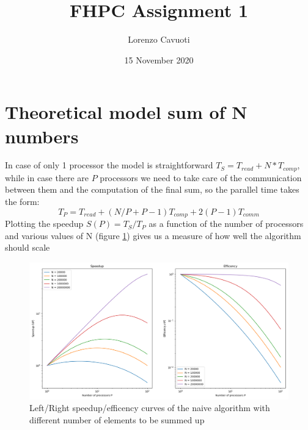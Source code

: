 \documentclass[a4paper]{article}
\author{Lorenzo Cavuoti}
\title{FHPC Assignment 1}
\begin{document}
\date{15 November 2020}
\maketitle


\section{Theoretical model sum of N numbers}
In case of only 1 processor the model is straightforward $T_S= T_{read} + N*T_{comp}$, while in case there are $P$ processors we need to take care of the communication between them and the computation of the final sum, so the parallel time takes the form:
\begin{equation*}
    T_P = T_{read} + (N/P + P-1)T_{comp} + 2(P-1)T_{comm}
\end{equation*}
Plotting the speedup $S(P) = T_S/T_P$ as a function of the number of processors and various values of N (figure \ref{fig:speedup_sum}) gives us a measure of how well the algorithm should scale
\begin{figure}[h]
    \centering
    \includegraphics[scale=0.45]{Speedup_sum_naive.png}
    \caption{Left/Right speedup/efficency curves of the naive algorithm with different number of elements to be summed up}
    \label{fig:speedup_sum}
\end{figure}
\end{document}
